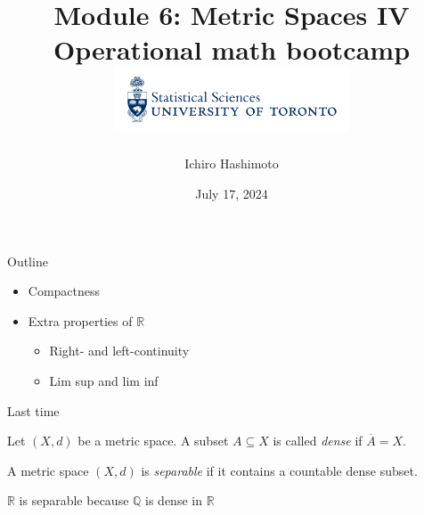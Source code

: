 \documentclass [aspectratio=169]{beamer}
\title[]{Module 6: Metric Spaces IV \\ {\large Operational math bootcamp}\\ \includegraphics[width=7cm]{dept_logo.png}\vspace{-1em}}
\author[]{Ichiro Hashimoto}
\institute[]{University of Toronto}
\date{July 17, 2024}
\newcommand{\R}{{\mathbb{R}}}
\newcommand{\Q}{{\mathbb{Q}}}
\begin{document}
{
\begin{frame}
    \titlepage
\end{frame}
}

\begin{frame}{Outline}
    \begin{itemize}
      \setlength\itemsep{1em}
    	\item Compactness
	\item Extra properties of $\R$
	\begin{itemize}
	\setlength\itemsep{0.3em}
	\item Right- and left-continuity
	\item Lim sup and lim inf
	\end{itemize}
    \end{itemize}
\end{frame}



\begin{frame}{Last time}
\begin{definition}
Let $(X,d)$ be a metric space. A subset $A\subseteq X$ is called \emph{dense} if $\overline{A} = X$.
\end{definition}

\vspace{0.5em}

\begin{definition}
A metric space $(X,d)$ is \emph{separable} if it contains a countable dense subset.
\end{definition}

\vspace{0.5em}

\begin{example}
$\R$ is separable because $\Q$ is dense in $\R$
\end{example}


\end{frame}
\end{document}

